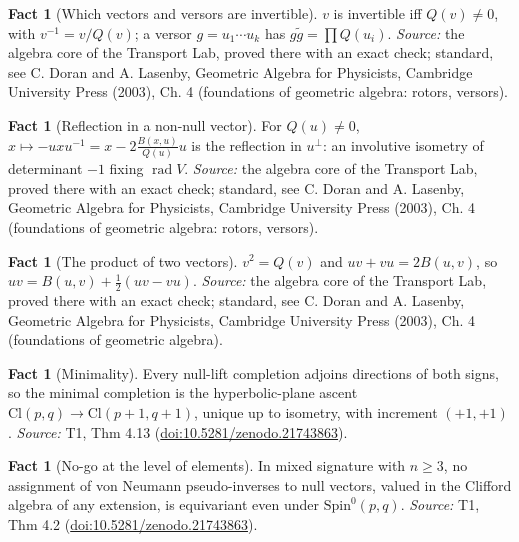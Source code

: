 \documentclass[11pt]{article}
\theoremstyle{definition}
\newtheorem{fact}[theorem]{Fact}
\theoremstyle{plain}
\providecommand{\Cl}{}\renewcommand{\Cl}{\mathrm{Cl}}
\providecommand{\Spin}{}\renewcommand{\Spin}{\mathrm{Spin}}
\begin{document}
\begin{fact}[Which vectors and versors are invertible]\label{c:std-algebra.inverse-of-vector}
$v$ is invertible iff $Q(v) \ne 0$, with $v^{-1} = v/Q(v)$; a versor $g = u_1 \cdots u_k$ has $g\tilde{g} = \prod Q(u_i)$.
\emph{Source:} the algebra core of the Transport Lab, proved there with an exact check; standard, see C. Doran and A. Lasenby, Geometric Algebra for Physicists, Cambridge University Press (2003), Ch. 4 (foundations of geometric algebra: rotors, versors).
\end{fact}

\begin{fact}[Reflection in a non-null vector]\label{c:std-algebra.reflection}
For $Q(u) \ne 0$, $x \mapsto -uxu^{-1} = x - 2\frac{B(x,u)}{Q(u)}u$ is the reflection in $u^{\perp}$: an involutive isometry of determinant $-1$ fixing $\operatorname{rad} V$.
\emph{Source:} the algebra core of the Transport Lab, proved there with an exact check; standard, see C. Doran and A. Lasenby, Geometric Algebra for Physicists, Cambridge University Press (2003), Ch. 4 (foundations of geometric algebra: rotors, versors).
\end{fact}

\begin{fact}[The product of two vectors]\label{c:std-algebra.vector-squares}
$v^{2} = Q(v)$ and $uv + vu = 2B(u, v)$, so $uv = B(u, v) + \tfrac12(uv - vu)$.
\emph{Source:} the algebra core of the Transport Lab, proved there with an exact check; standard, see C. Doran and A. Lasenby, Geometric Algebra for Physicists, Cambridge University Press (2003), Ch. 4 (foundations of geometric algebra).
\end{fact}

\begin{fact}[Minimality]\label{c:transport.minimality}
Every null-lift completion adjoins directions of both signs, so the minimal completion is the hyperbolic-plane ascent $\Cl(p,q) \to \Cl(p{+}1,q{+}1)$, unique up to isometry, with increment $(+1,+1)$.
\emph{Source:} T1, Thm 4.13 (\href{https://doi.org/10.5281/zenodo.21743863}{doi:10.5281/zenodo.21743863}).
\end{fact}

\begin{fact}[No-go at the level of elements]\label{c:transport.no-go-level-elements}
In mixed signature with $n \geq 3$, no assignment of von Neumann pseudo-inverses to null vectors, valued in the Clifford algebra of any extension, is equivariant even under $\Spin^0(p,q)$.
\emph{Source:} T1, Thm 4.2 (\href{https://doi.org/10.5281/zenodo.21743863}{doi:10.5281/zenodo.21743863}).
\end{fact}
\end{document}
